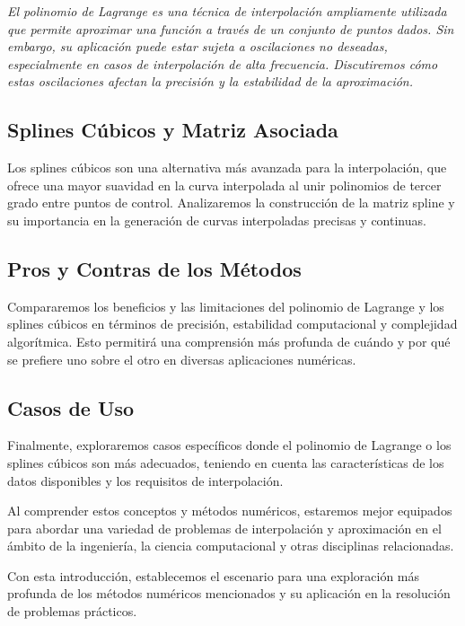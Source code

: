 \documentclass[12pt,a4]{article} %
\begin{document}
\begin{multicols}{2}
\textit{El polinomio de Lagrange es una técnica de interpolación ampliamente utilizada que permite aproximar una función a través de un conjunto de puntos dados. Sin embargo, su aplicación puede estar sujeta a oscilaciones no deseadas, especialmente en casos de interpolación de alta frecuencia. Discutiremos cómo estas oscilaciones afectan la precisión y la estabilidad de la aproximación. }

\subsection{Splines Cúbicos y Matriz Asociada}

Los splines cúbicos son una alternativa más avanzada para la interpolación, que ofrece una mayor suavidad en la curva interpolada al unir polinomios de tercer grado entre puntos de control. Analizaremos la construcción de la matriz spline y su importancia en la generación de curvas interpoladas precisas y continuas.

\subsection{Pros y Contras de los Métodos}

Compararemos los beneficios y las limitaciones del polinomio de Lagrange y los splines cúbicos en términos de precisión, estabilidad computacional y complejidad algorítmica. Esto permitirá una comprensión más profunda de cuándo y por qué se prefiere uno sobre el otro en diversas aplicaciones numéricas.

\subsection{Casos de Uso}

Finalmente, exploraremos casos específicos donde el polinomio de Lagrange o los splines cúbicos son más adecuados, teniendo en cuenta las características de los datos disponibles y los requisitos de interpolación.

Al comprender estos conceptos y métodos numéricos, estaremos mejor equipados para abordar una variedad de problemas de interpolación y aproximación en el ámbito de la ingeniería, la ciencia computacional y otras disciplinas relacionadas.

Con esta introducción, establecemos el escenario para una exploración más profunda de los métodos numéricos mencionados y su aplicación en la resolución de problemas prácticos.


\end{multicols}
\end{document}
